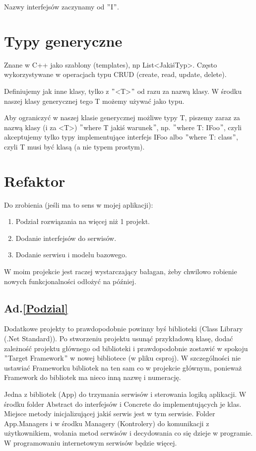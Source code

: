 \documentclass[10pt]{article}
\begin{document}
Nazwy interfejsów zaczynamy od $"$I$"$.

\section{Typy generyczne}
Znane w C++ jako szablony (templates), np List<JakiśTyp>. Często wykorzystywane w operacjach typu CRUD (create, read, update, delete).

Definiujemy jak inne klasy, tylko z $"$<T>$"$ od razu za nazwą klasy. W środku naszej klasy generycznej tego T możemy używać jako typu.

Aby ograniczyć w naszej klasie generycznej możliwe typy T, piszemy zaraz za nazwą klasy (i za <T>) $"$where T jakiś warunek$"$, np. $"$where T: IFoo$"$, czyli akceptujemy tylko typy implementujące interfejs IFoo albo $"$where T: class$"$, czyli T musi być klasą (a nie typem prostym).

\section{Refaktor}
Do zrobienia (jeśli ma to sens w mojej aplikacji):
\begin{enumerate}
\item \label{Podzial} Podział rozwiązania na więcej niż 1 projekt.
\item \label{Interfejsy} Dodanie interfejsów do serwisów.
\item \label{Elementy Bazowe} Dodanie serwisu i modelu bazowego.
\end{enumerate}

W moim projekcie jest raczej wystarczający bałagan, żeby chwilowo robienie nowych funkcjonalności odłożyć na później.

\subsection{Ad.\ref{Podzial}}
Dodatkowe projekty to prawdopodobnie powinny byś biblioteki (Class Library (.Net Standard)). Po stworzeniu projektu usunąć przykładową klasę, dodać zależność projektu głównego od biblioteki i prawdopodobnie zostawić w spokoju $"$Target Framework$"$ w nowej bibliotece (w pliku csproj). W szczególności nie ustawiać Frameworku bibliotek na ten sam co w projekcie głównym, ponieważ Framework do bibliotek ma nieco inną nazwę i numerację.

Jedna z bibliotek (App) do trzymania serwisów i sterowania logiką aplikacji. W środku folder Abstract do interfejsów i Concrete do implementujących je klas. Miejsce metody inicjalizującej jakiś serwis jest w tym serwisie. Folder App.Managers i w środku Managery (Kontrolery) do komunikacji z użytkownikiem, wołania metod serwisów i decydowania co się dzieje w programie. W programowaniu internetowym serwisów będzie więcej.
\end{document}
